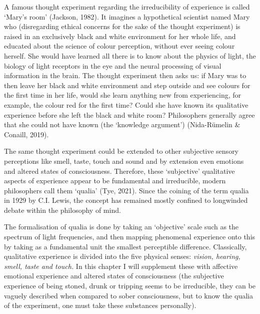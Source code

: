A famous thought experiment regarding the irreducibility of experience is called ‘Mary’s room’ (Jackson, 1982). It imagines a hypothetical scientist named Mary who (disregarding ethical concerns for the sake of the thought experiment) is raised in an exclusively black and white environment for her whole life, and educated about the science of colour perception, without ever seeing colour herself. She would have learned all there is to know about the physics of light, the biology of light receptors in the eye and the neural processing of visual information in the brain. The thought experiment then asks us: if Mary was to then leave her black and white environment and step outside and see colours for the first time in her life, would she learn anything new from experiencing, for example, the colour red for the first time? Could she have known its qualitative experience before she left the black and white room? Philosophers generally agree that she could not have known (the ‘knowledge argument’) (Nida-Rümelin \& Conaill, 2019). 

The same thought experiment could be extended to other subjective sensory perceptions like smell, taste, touch and sound and by extension even emotions and altered states of consciousness. Therefore, these ‘subjective’ qualitative aspects of experience appear to be fundamental and irreducible, modern philosophers call them ‘qualia’ (Tye, 2021). Since the coining of the term qualia in 1929 by C.I. Lewis, the concept has remained mostly confined to longwinded debate within the philosophy of mind.  

The formalisation of qualia is done by taking an ‘objective’ scale such as the spectrum of light frequencies, and then mapping phenomenal experience onto this by taking as a fundamental unit the smallest perceptible difference. Classically, qualitative experience is divided into the five physical senses: \textit{vision, hearing, smell, taste and touch.} In this chapter I will supplement these with affective emotional experience and altered states of consciousness (the subjective experience of being stoned, drunk or tripping seems to be irreducible, they can be vaguely described when compared to sober consciousness, but to know the qualia of the experiment, one must take these substances personally). 

